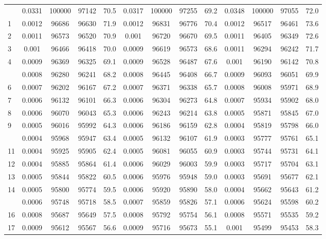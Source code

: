 \documentclass[
  14pt,
]{article}
\begin{document}
\begin{longtable}[t]{lcccccccccccc}
\endfoot
\bottomrule
\endlastfoot
0 & 0.0331 & 100000 & 97142 & 70.5 & 0.0317 & 100000 & 97255 & 69.2 & 0.0348 & 100000 & 97055 & 72.0\\
1 & 0.0012 & 96686 & 96630 & 71.9 & 0.0012 & 96831 & 96776 & 70.4 & 0.0012 & 96517 & 96461 & 73.6\\
2 & 0.0011 & 96573 & 96520 & 70.9 & 0.001 & 96720 & 96670 & 69.5 & 0.0011 & 96405 & 96349 & 72.6\\
3 & 0.001 & 96466 & 96418 & 70.0 & 0.0009 & 96619 & 96573 & 68.6 & 0.0011 & 96294 & 96242 & 71.7\\
4 & 0.0009 & 96369 & 96325 & 69.1 & 0.0009 & 96528 & 96487 & 67.6 & 0.001 & 96190 & 96142 & 70.8\\
\addlinespace
5 & 0.0008 & 96280 & 96241 & 68.2 & 0.0008 & 96445 & 96408 & 66.7 & 0.0009 & 96093 & 96051 & 69.9\\
6 & 0.0007 & 96202 & 96167 & 67.2 & 0.0007 & 96371 & 96338 & 65.7 & 0.0008 & 96008 & 95971 & 68.9\\
7 & 0.0006 & 96132 & 96101 & 66.3 & 0.0006 & 96304 & 96273 & 64.8 & 0.0007 & 95934 & 95902 & 68.0\\
8 & 0.0006 & 96070 & 96043 & 65.3 & 0.0006 & 96243 & 96214 & 63.8 & 0.0005 & 95871 & 95845 & 67.0\\
9 & 0.0005 & 96016 & 95992 & 64.3 & 0.0006 & 96186 & 96159 & 62.8 & 0.0004 & 95819 & 95798 & 66.0\\
\addlinespace
10 & 0.0004 & 95968 & 95947 & 63.4 & 0.0005 & 96132 & 96107 & 61.9 & 0.0003 & 95777 & 95761 & 65.1\\
11 & 0.0004 & 95925 & 95905 & 62.4 & 0.0005 & 96081 & 96055 & 60.9 & 0.0003 & 95744 & 95731 & 64.1\\
12 & 0.0004 & 95885 & 95864 & 61.4 & 0.0006 & 96029 & 96003 & 59.9 & 0.0003 & 95717 & 95704 & 63.1\\
13 & 0.0005 & 95844 & 95822 & 60.5 & 0.0006 & 95976 & 95948 & 59.0 & 0.0003 & 95691 & 95677 & 62.1\\
14 & 0.0005 & 95800 & 95774 & 59.5 & 0.0006 & 95920 & 95890 & 58.0 & 0.0004 & 95662 & 95643 & 61.2\\
\addlinespace
15 & 0.0006 & 95748 & 95718 & 58.5 & 0.0007 & 95859 & 95826 & 57.1 & 0.0006 & 95624 & 95598 & 60.2\\
16 & 0.0008 & 95687 & 95649 & 57.5 & 0.0008 & 95792 & 95754 & 56.1 & 0.0008 & 95571 & 95535 & 59.2\\
17 & 0.0009 & 95612 & 95567 & 56.6 & 0.0009 & 95716 & 95673 & 55.1 & 0.001 & 95499 & 95453 & 58.3\\

\end{longtable}
\end{document}
